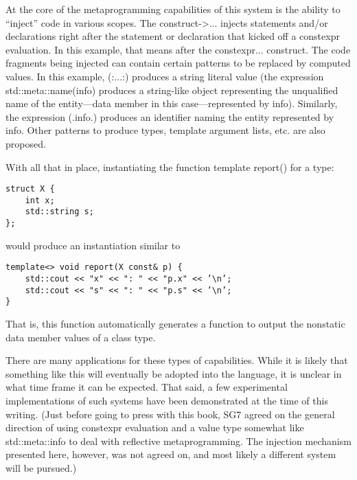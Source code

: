 At the core of the metaprogramming capabilities of this system is the ability to “inject” code in various scopes. The construct->{...} injects statements and/or declarations right after the statement or declaration that kicked off a constexpr evaluation. In this example, that means after the constexpr{...} construct. The code fragments being injected can contain certain patterns to be replaced by computed values. In this example, (:...:) produces a string literal value (the expression std::meta::name(info) produces a string-like object representing the unqualified name of the entity—data member in this case—represented by info). Similarly, the expression (.info.) produces an identifier naming the entity represented by info. Other patterns to produce types, template argument lists, etc. are also proposed.

With all that in place, instantiating the function template report() for a type:

\begin{lstlisting}[style=styleCXX]
struct X {
	int x;
	std::string s;
};
\end{lstlisting}

would produce an instantiation similar to

\begin{lstlisting}[style=styleCXX]
template<> void report(X const& p) {
	std::cout << "x" << ": " << "p.x" << ’\n’;
	std::cout << "s" << ": " << "p.s" << ’\n’;
}
\end{lstlisting}

That is, this function automatically generates a function to output the nonstatic data member values of a class type.

There are many applications for these types of capabilities. While it is likely that something like this will eventually be adopted into the language, it is unclear in what time frame it can be expected. That said, a few experimental implementations of such systems have been demonstrated at the time of this writing. (Just before going to press with this book, SG7 agreed on the general direction of using constexpr evaluation and a value type somewhat like std::meta::info to deal with reflective metaprogramming. The injection mechanism presented here, however, was not agreed on, and most likely a different system will be pursued.)

























